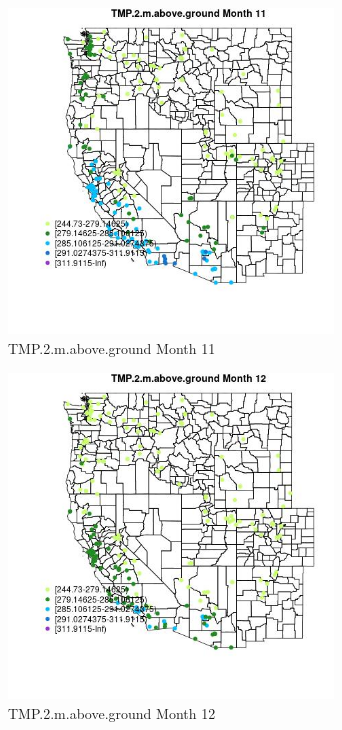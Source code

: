 \begin{figure} 
\centering  
\includegraphics[width=0.77\textwidth]{Code_Outputs/Report_ML_input_PM25_Step4_part_e_de_duplicated_aveswNAs_MapObsMo11TMP2maboveground.jpg} 
\caption{\label{fig:Report_ML_input_PM25_Step4_part_e_de_duplicated_aveswNAsMapObsMo11TMP2maboveground}TMP.2.m.above.ground Month 11} 
\end{figure} 
 

\clearpage 

\begin{figure} 
\centering  
\includegraphics[width=0.77\textwidth]{Code_Outputs/Report_ML_input_PM25_Step4_part_e_de_duplicated_aveswNAs_MapObsMo12TMP2maboveground.jpg} 
\caption{\label{fig:Report_ML_input_PM25_Step4_part_e_de_duplicated_aveswNAsMapObsMo12TMP2maboveground}TMP.2.m.above.ground Month 12} 
\end{figure} 
 

